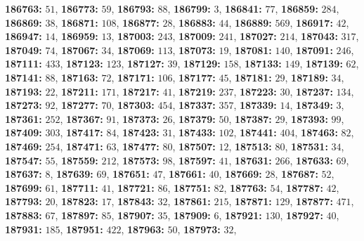\textsf{\bfseries 186763:} $51$, \textsf{\bfseries 186773:} $59$, \textsf{\bfseries 186793:} $88$, \textsf{\bfseries 186799:} $3$, \textsf{\bfseries 186841:} $77$, \textsf{\bfseries 186859:} $284$, \textsf{\bfseries 186869:} $38$, \textsf{\bfseries 186871:} $108$, \textsf{\bfseries 186877:} $28$, \textsf{\bfseries 186883:} $44$, \textsf{\bfseries 186889:} $569$, \textsf{\bfseries 186917:} $42$, \textsf{\bfseries 186947:} $14$, \textsf{\bfseries 186959:} $13$, \textsf{\bfseries 187003:} $243$, \textsf{\bfseries 187009:} $241$, \textsf{\bfseries 187027:} $214$, \textsf{\bfseries 187043:} $317$, \textsf{\bfseries 187049:} $74$, \textsf{\bfseries 187067:} $34$, \textsf{\bfseries 187069:} $113$, \textsf{\bfseries 187073:} $19$, \textsf{\bfseries 187081:} $140$, \textsf{\bfseries 187091:} $246$, \textsf{\bfseries 187111:} $433$, \textsf{\bfseries 187123:} $123$, \textsf{\bfseries 187127:} $39$, \textsf{\bfseries 187129:} $158$, \textsf{\bfseries 187133:} $149$, \textsf{\bfseries 187139:} $62$, \textsf{\bfseries 187141:} $88$, \textsf{\bfseries 187163:} $72$, \textsf{\bfseries 187171:} $106$, \textsf{\bfseries 187177:} $45$, \textsf{\bfseries 187181:} $29$, \textsf{\bfseries 187189:} $34$, \textsf{\bfseries 187193:} $22$, \textsf{\bfseries 187211:} $171$, \textsf{\bfseries 187217:} $41$, \textsf{\bfseries 187219:} $237$, \textsf{\bfseries 187223:} $30$, \textsf{\bfseries 187237:} $134$, \textsf{\bfseries 187273:} $92$, \textsf{\bfseries 187277:} $70$, \textsf{\bfseries 187303:} $454$, \textsf{\bfseries 187337:} $357$, \textsf{\bfseries 187339:} $14$, \textsf{\bfseries 187349:} $3$, \textsf{\bfseries 187361:} $252$, \textsf{\bfseries 187367:} $91$, \textsf{\bfseries 187373:} $26$, \textsf{\bfseries 187379:} $50$, \textsf{\bfseries 187387:} $29$, \textsf{\bfseries 187393:} $99$, \textsf{\bfseries 187409:} $303$, \textsf{\bfseries 187417:} $84$, \textsf{\bfseries 187423:} $31$, \textsf{\bfseries 187433:} $102$, \textsf{\bfseries 187441:} $404$, \textsf{\bfseries 187463:} $82$, \textsf{\bfseries 187469:} $254$, \textsf{\bfseries 187471:} $63$, \textsf{\bfseries 187477:} $80$, \textsf{\bfseries 187507:} $12$, \textsf{\bfseries 187513:} $80$, \textsf{\bfseries 187531:} $34$, \textsf{\bfseries 187547:} $55$, \textsf{\bfseries 187559:} $212$, \textsf{\bfseries 187573:} $98$, \textsf{\bfseries 187597:} $41$, \textsf{\bfseries 187631:} $266$, \textsf{\bfseries 187633:} $69$, \textsf{\bfseries 187637:} $8$, \textsf{\bfseries 187639:} $69$, \textsf{\bfseries 187651:} $47$, \textsf{\bfseries 187661:} $40$, \textsf{\bfseries 187669:} $28$, \textsf{\bfseries 187687:} $52$, \textsf{\bfseries 187699:} $61$, \textsf{\bfseries 187711:} $41$, \textsf{\bfseries 187721:} $86$, \textsf{\bfseries 187751:} $82$, \textsf{\bfseries 187763:} $54$, \textsf{\bfseries 187787:} $42$, \textsf{\bfseries 187793:} $20$, \textsf{\bfseries 187823:} $17$, \textsf{\bfseries 187843:} $32$, \textsf{\bfseries 187861:} $215$, \textsf{\bfseries 187871:} $129$, \textsf{\bfseries 187877:} $471$, \textsf{\bfseries 187883:} $67$, \textsf{\bfseries 187897:} $85$, \textsf{\bfseries 187907:} $35$, \textsf{\bfseries 187909:} $6$, \textsf{\bfseries 187921:} $130$, \textsf{\bfseries 187927:} $40$, \textsf{\bfseries 187931:} $185$, \textsf{\bfseries 187951:} $422$, \textsf{\bfseries 187963:} $50$, \textsf{\bfseries 187973:} $32$, 
